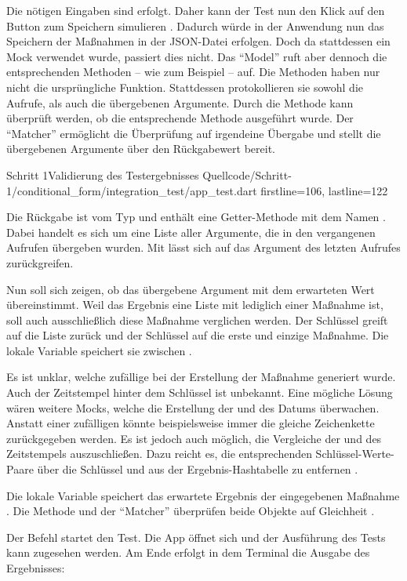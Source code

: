 Die nötigen Eingaben sind erfolgt.
Daher kann der Test nun den Klick auf den Button zum Speichern simulieren .
Dadurch würde in der Anwendung nun das Speichern der Maßnahmen in der JSON-Datei erfolgen.
Doch da stattdessen ein Mock verwendet wurde, passiert dies nicht.
Das \enquote{Model} ruft aber dennoch die entsprechenden Methoden -- wie zum Beispiel  -- auf.
Die Methoden haben nur nicht die ursprüngliche Funktion.
Stattdessen protokollieren sie sowohl die Aufrufe, als auch die übergebenen Argumente.
Durch die Methode   kann überprüft werden, ob die entsprechende Methode  ausgeführt wurde.
Der \enquote{Matcher}  ermöglicht die Überprüfung auf irgendeine Übergabe und stellt die übergebenen Argumente über den Rückgabewert bereit.

\begin{alexlisting}{Schritt 1}{Validierung des Testergebnisses}
  {Quellcode/Schritt-1/conditional_form/integration_test/app_test.dart}
  {firstline=106, lastline=122}
\end{alexlisting}

Die Rückgabe ist vom Typ  und enthält eine Getter-Methode mit dem Namen .
Dabei handelt es sich um eine Liste aller Argumente, die in den vergangenen Aufrufen übergeben wurden.
Mit  lässt sich auf das Argument des letzten Aufrufes zurückgreifen.

Nun soll sich zeigen, ob das übergebene Argument mit dem erwarteten Wert übereinstimmt.
Weil das Ergebnis eine Liste mit lediglich einer Maßnahme ist, soll auch ausschließlich diese Maßnahme verglichen werden.
Der Schlüssel  greift auf die Liste zurück und der Schlüssel  auf die erste und einzige Maßnahme.
Die lokale Variable  speichert sie zwischen .

Es ist unklar, welche zufällige  bei der Erstellung der Maßnahme generiert wurde.
Auch der Zeitstempel hinter dem Schlüssel  ist unbekannt.
Eine mögliche Lösung wären weitere Mocks, welche die Erstellung der  und des Datums überwachen. Anstatt einer zufälligen  könnte beispielsweise immer die gleiche Zeichenkette zurückgegeben werden.
Es ist jedoch auch möglich, die Vergleiche der  und des Zeitstempels auszuschließen.
Dazu reicht es, die entsprechenden Schlüssel-Werte-Paare über die Schlüssel  und  aus der Ergebnis-Hashtabelle zu entfernen .

Die lokale Variable  speichert das erwartete Ergebnis der eingegebenen Maßnahme .
Die Methode  und der \enquote{Matcher}  überprüfen beide Objekte auf Gleichheit .

Der Befehl  startet den Test. Die App öffnet sich und der Ausführung des Tests kann zugesehen werden. Am Ende erfolgt in dem Terminal die Ausgabe des Ergebnisses: 


\ifIncludeFigures \clearpage \fi
